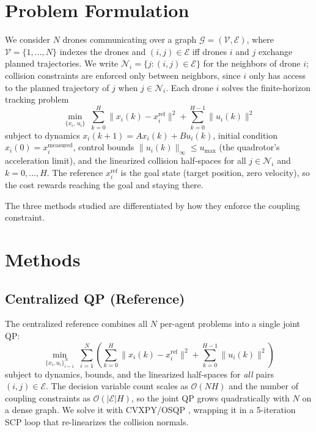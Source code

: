 \documentclass[11pt,onecolumn]{article}
\begin{document}
\section{Problem Formulation}
\label{sec:problem}

We consider $N$ drones communicating over a graph $\mathcal{G} = (\mathcal{V}, \mathcal{E})$,
where $\mathcal{V} = \{1,\ldots,N\}$ indexes the drones and $(i,j) \in \mathcal{E}$ iff
drones $i$ and $j$ exchange planned trajectories.  We write
$\mathcal{N}_i = \{j : (i,j) \in \mathcal{E}\}$ for the neighbors of drone $i$; collision
constraints are enforced only between neighbors, since $i$ only has access to the
planned trajectory of $j$ when $j \in \mathcal{N}_i$.
Each drone $i$ solves the finite-horizon tracking problem
\begin{equation}
  \min_{\{x_i,\, u_i\}} \; \sum_{k=0}^{H} \|x_i(k) - x_i^{\mathrm{ref}}\|^2
                          + \sum_{k=0}^{H-1} \|u_i(k)\|^2
  \label{eq:per_agent}
\end{equation}
subject to dynamics $x_i(k+1) = A x_i(k) + B u_i(k)$, initial condition
$x_i(0) = x_i^{\mathrm{measured}}$, control bounds $\|u_i(k)\|_\infty \le u_{\max}$ (the quadrotor's acceleration limit),
and the linearized collision half-spaces for all $j \in \mathcal{N}_i$ and $k = 0,\ldots,H$.
The reference $x_i^{\mathrm{ref}}$ is the goal state (target position, zero velocity), so
the cost rewards reaching the goal and staying there.

The three methods studied are differentiated by how they enforce the coupling constraint.

\section{Methods}
\label{sec:methods}

\subsection{Centralized QP (Reference)}

The centralized reference combines all $N$ per-agent problems into a single joint QP:
\begin{equation}
  \min_{\{x_i, u_i\}_{i=1}^N} \; \sum_{i=1}^N \left(
    \sum_{k=0}^{H} \|x_i(k) - x_i^{\mathrm{ref}}\|^2
    + \sum_{k=0}^{H-1} \|u_i(k)\|^2 \right)
  \label{eq:centralized}
\end{equation}
subject to dynamics, bounds, and the linearized half-spaces for \emph{all} pairs
$(i,j) \in \mathcal{E}$.  The decision variable count scales as
$\mathcal{O}(N H)$ and the number of coupling constraints as $\mathcal{O}(|\mathcal{E}| H)$,
so the joint QP grows quadratically with $N$ on a dense graph.  We solve it with
CVXPY/OSQP \cite{stellato2020osqp}, wrapping it in a 5-iteration SCP loop that
re-linearizes the collision normals.
\end{document}
